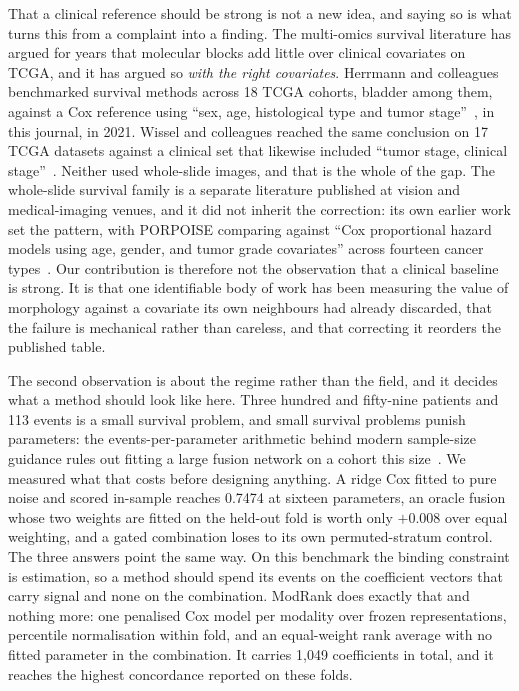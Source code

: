 \documentclass[11pt]{article}
\begin{document}
That a clinical reference should be strong is not a new idea, and saying so is what turns this
from a complaint into a finding. The multi-omics survival literature has argued for years that
molecular blocks add little over clinical covariates on TCGA, and it has argued so \emph{with the
right covariates}. Herrmann and colleagues benchmarked survival methods across 18 TCGA cohorts,
bladder among them, against a Cox reference using ``sex, age, histological type and tumor
stage''~\citep{herrmann2021benchmark}, in this journal, in 2021. Wissel and colleagues reached the
same conclusion on 17 TCGA datasets against a clinical set that likewise included ``tumor stage,
clinical stage''~\citep{wissel2023noise}. Neither used whole-slide images, and that is the whole of
the gap. The whole-slide survival family is a separate literature published at vision and
medical-imaging venues, and it did not inherit the correction: its own earlier work set the
pattern, with PORPOISE comparing against ``Cox proportional hazard models using age, gender, and
tumor grade covariates'' across fourteen cancer types~\citep{chen2022porpoise}. Our contribution
is therefore not the observation that a clinical baseline is strong. It is that one identifiable
body of work has been measuring the value of morphology against a covariate its own neighbours had
already discarded, that the failure is mechanical rather than careless, and that correcting it
reorders the published table.

The second observation is about the regime rather than the field, and it decides what a method
should look like here. Three hundred and fifty-nine patients and 113 events is a small survival
problem, and small survival problems punish parameters: the events-per-parameter arithmetic behind
modern sample-size guidance rules out fitting a large fusion network on a cohort this
size~\citep{riley2020samplesize}. We measured what that costs before designing anything. A ridge
Cox fitted to pure noise and scored in-sample reaches 0.7474 at sixteen parameters, an oracle
fusion whose two weights are fitted on the held-out fold is worth only $+0.008$ over equal
weighting, and a gated combination loses to its own permuted-stratum control. The three answers
point the same way. On this benchmark the binding constraint is estimation, so a method should
spend its events on the coefficient vectors that carry signal and none on the combination.
ModRank does exactly that and nothing more: one penalised Cox model per modality over
frozen representations, percentile normalisation within fold, and an equal-weight rank average with
no fitted parameter in the combination. It carries 1,049 coefficients in total, and it reaches the
highest concordance reported on these folds.
\end{document}
